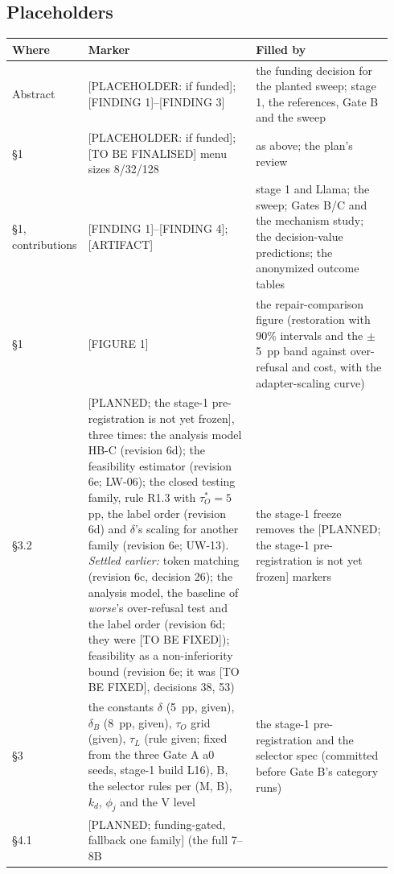 \documentclass{article}
\theoremstyle{plain}
\theoremstyle{definition}
\theoremstyle{remark}
\begin{document}
\subsection{Placeholders}

\begin{longtable}{@{}L{0.14\linewidth}L{0.44\linewidth}L{0.36\linewidth}@{}}
  \toprule
  \textbf{Where} & \textbf{Marker} & \textbf{Filled by} \\
  \midrule
  \endhead
  \bottomrule
  \endfoot
  Abstract & [PLACEHOLDER: if funded]; [FINDING 1]--[FINDING 3] & the funding
      decision for the planted sweep; stage 1, the references, Gate B and the
      sweep \\
  \S{}1 & [PLACEHOLDER: if funded]; [TO BE FINALISED] menu sizes 8/32/128 & as
      above; the plan's review \\
  \S{}1, contributions & [FINDING 1]--[FINDING 4]; [ARTIFACT] & stage 1 and
      Llama; the sweep; Gates B/C and the mechanism study; the decision-value
      predictions; the anonymized outcome tables \\
  \S{}1 & [FIGURE 1] & the repair-comparison figure (restoration with 90\%
      intervals and the $\pm$5~pp band against over-refusal and cost, with the
      adapter-scaling curve) \\
  \S{}3.2 & [PLANNED; the stage-1 pre-registration is not yet frozen], three
      times: the analysis model HB-C (revision 6d); the feasibility estimator
      (revision 6e; LW-06); the closed testing family, rule R1.3 with $\tau_O^*
      = 5$ pp, the label order (revision 6d) and $\delta$'s scaling for another
      family (revision 6e; UW-13). \emph{Settled earlier:} token matching
      (revision 6c, decision 26); the analysis model, the baseline of
      \emph{worse}'s over-refusal test and the label order (revision 6d; they
      were [TO BE FIXED]); feasibility as a non-inferiority bound (revision 6e;
      it was [TO BE FIXED], decisions 38, 53) & the stage-1 freeze removes the
      [PLANNED; the stage-1 pre-registration is not yet frozen] markers \\
  \S{}3 & the constants $\delta$ (5~pp, given), $\delta_{B}$ (8~pp, given),
      $\tau_{O}$ grid (given), $\tau_{L}$ (rule given; fixed from the three Gate
      A a0 seeds, stage-1 build L16), B, the selector rules per (M, B), $k_{d}$,
      $\phi_{j}$ and the V level & the stage-1 pre-registration and the selector
      spec (committed before Gate B's category runs) \\
  \S{}4.1 & [PLANNED; funding-gated, fallback one family] (the full 7--8B

\end{longtable}
\end{document}
